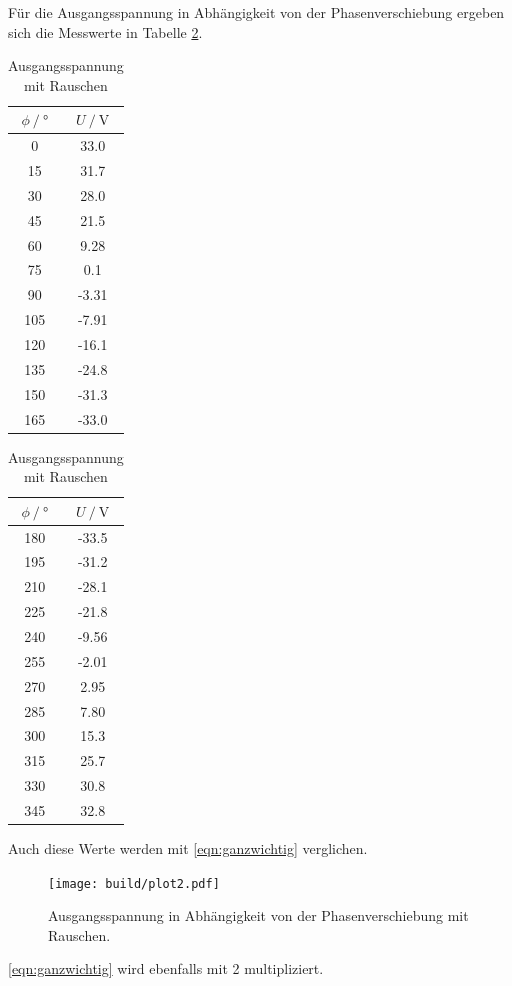 Für die Ausgangsspannung in Abhängigkeit von der Phasenverschiebung ergeben sich die Messwerte in Tabelle \ref{tab:mit_Rauschen}.
\begin{table}
  \centering
  \caption{Ausgangsspannung mit Rauschen}
  \label{tab:mit_Rauschen}
  \begin{subtable}{0.48\textwidth}
    \centering
  \begin{tabular}{cc}
    \toprule {$\phi \:/\: °$} & {$U \:/\: \si{\volt}$} \\
    \midrule
    0	& 33.0 \\
    15 & 31.7 \\
    30 & 28.0 \\
    45	& 21.5 \\
    60 & 9.28 \\
    75 & 0.1 \\
    90	& -3.31 \\
    105 & -7.91 \\
    120	& -16.1 \\
    135	& -24.8 \\
    150	& -31.3 \\
    165 & -33.0 \\
    \bottomrule
    \end{tabular}
  \end{subtable}
  \begin{subtable}{0.48\textwidth}
    \centering
  \begin{tabular}{cc}
    \toprule {$\phi \:/\: °$} & {$U \:/\: \si{\volt}$} \\
    \midrule
    180	& -33.5 \\
    195	& -31.2 \\
    210	& -28.1 \\
    225	& -21.8 \\
    240 & -9.56 \\
    255	& -2.01 \\
    270	& 2.95 \\
    285	& 7.80 \\
    300	& 15.3 \\
    315	& 25.7 \\
    330	& 30.8 \\
    345	& 32.8 \\
    \bottomrule
    \end{tabular}
  \end{subtable}
\end{table}

Auch diese Werte werden mit \ref{eqn:ganzwichtig} verglichen.
\begin{figure}
  \centering
  \texttt{[image: build/plot2.pdf]}
\caption{Ausgangsspannung in Abhängigkeit von der Phasenverschiebung mit Rauschen.}
  \label{fig:mit_rauschen}
\end{figure}
\ref{eqn:ganzwichtig} wird ebenfalls mit 2 multipliziert.

